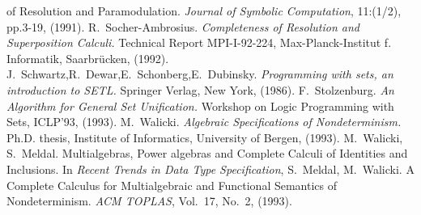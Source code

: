 \begin{thebibliography}{MM99}
   of Resolution and Paramodulation. {\em Journal of Symbolic Computation}, 
   11:(1/2), pp.3-19, (1991).
 R.~Socher-Ambrosius. 
   {\em Completeness of Resolution and Superposition Calculi.}
   Technical Report
   MPI-I-92-224, Max-Planck-Institut f. Informatik, Saarbr\"ucken, (1992).
 J.~Schwartz,R.~Dewar,E.~Schonberg,E.~Dubinsky. 
   {\em Programming with sets, an introduction to SETL. }
   Springer Verlag, New York, (1986).
 F.~Stolzenburg. 
   {\em An Algorithm for General Set Unification.}
   Workshop on Logic Programming with Sets, ICLP'93, (1993).
 M.~Walicki. 
   {\em Algebraic Specifications of Nondeterminism.}
   Ph.D. thesis, Institute of Informatics, University of Bergen, (1993).
 M.~Walicki, S.~Meldal. Multialgebras, Power algebras
   and Complete Calculi of Identities and Inclusions. In {\it Recent Trends
   in Data Type Specification}, 
 S.~Meldal, M.~Walicki. A Complete Calculus for 
   Multialgebraic and Functional Semantics of Nondeterminism. 
   {\em ACM TOPLAS}, Vol.~17, No.~2, (1993).
\end{thebibliography} 



